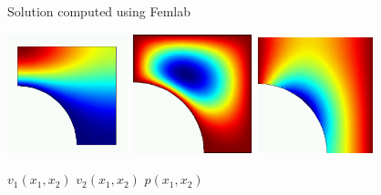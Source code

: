 \documentclass[pdf,umbc4,slideColor,colorBG]{prosper}
\begin{document}

\begin{slide}{Solution computed using Femlab}

\bigskip
\bigskip

\begin{center}
	\includegraphics[height=3.5cm]{ns-2d-u.eps}
	\includegraphics[height=3.5cm]{ns-2d-v.eps}
	\includegraphics[height=3.4cm]{ns-2d-p.eps}
\end{center}

\begin{center}
	$v_1(x_1,x_2)$ 
	\hspace{2.5cm}
	$v_2(x_1,x_2)$ 
	\hspace{2.5cm}
	$p(x_1,x_2)$ 
\end{center}

\end{slide}

\end{document}
